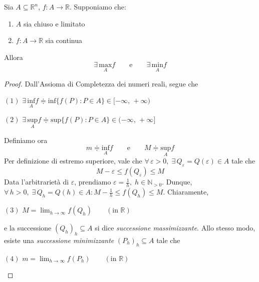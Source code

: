 \begin{thm}[di Weierstrass]
Sia $A \subseteq \mathbb{R}^n$, $f : A \longrightarrow \mathbb{R}$. Supponiamo che:
\begin{enumerate}[labelindent=\parindent,leftmargin=*,label=\textnormal{(\roman*)},start=1]
\item $A$ sia chiuso e limitato
\item $f : A \longrightarrow \mathbb{R}$ sia continua
\end{enumerate}
Allora
$$
\exists \, \underset{A}{\mathrm{max}}f \qquad \text{e} \qquad \exists \, \underset{A}{\mathrm{min}}f
$$
\end{thm}
\begin{proof}
Dall'Assioma di Completezza dei numeri reali, segue che
\begin{center}
$\mathrm{(1)}$
\hfill
$\displaystyle
\exists \, \underset{A}{\mathrm{inf}}f \doteqdot \mathrm{inf} \lbrace f(P) : P \in A \rbrace \in [-\infty,\,+\infty)
$
\hfill \null \\
\end{center}
\begin{center}
$\mathrm{(2)}$
\hfill
$\displaystyle
\exists \, \underset{A}{\mathrm{sup}}f \doteqdot \mathrm{sup} \lbrace f(P) : P \in A \rbrace \in (-\infty,\,+\infty]
$
\hfill \null \\
\end{center}
Definiamo ora
$$
m \doteqdot \underset{A}{\mathrm{inf}}f \qquad \text{e} \qquad M \doteqdot \underset{A}{\mathrm{sup}}f
$$
Per definizione di estremo superiore, vale che $\forall \, \varepsilon > 0, \; \exists \, Q_{\varepsilon} = Q(\varepsilon) \in A$ tale che
$$
M - \varepsilon \leq f(Q_{\varepsilon}) \leq M
$$
Data l'arbitrarietà di $\varepsilon$, prendiamo $\varepsilon = \frac{1}{h}, \; h \in \mathbb{N}_{>0}$. Dunque, $\forall \, h > 0, \; \exists \, Q_h = Q(h) \in A : M - \frac{1}{h} \leq f(Q_h) \leq M$. Chiaramente,
\begin{center}
$\mathrm{(3)}$
\hfill
$\displaystyle
M = \lim_{h \rightarrow \infty} f(Q_h) \qquad (\text{in } \mathbb{R})
$
\hfill \null \\
\end{center}
e la successione $(Q_h)_h \subseteq A$ si dice \emph{successione massimizzante}. Allo stesso modo, esiste una \emph{successione minimizzante} $(P_h)_h \subseteq A$ tale che
\begin{center}
$\mathrm{(4)}$
\hfill
$\displaystyle
m = \lim_{h \rightarrow \infty} f(P_h) \qquad (\text{in } \mathbb{R})
$
\hfill \null \\

\end{center}
\end{proof}
